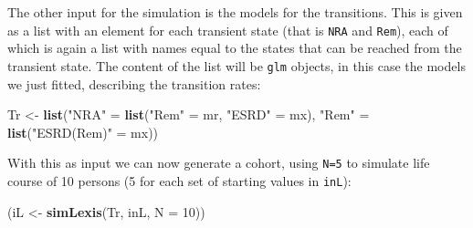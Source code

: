 \documentclass[
]{book}
\newenvironment{Shaded}{\begin{snugshade}}{\end{snugshade}}
\newcommand{\AttributeTok}[1]{\textcolor[rgb]{0.13,0.29,0.53}{#1}}
\newcommand{\DecValTok}[1]{\textcolor[rgb]{0.00,0.00,0.81}{#1}}
\newcommand{\FunctionTok}[1]{\textcolor[rgb]{0.13,0.29,0.53}{\textbf{#1}}}
\newcommand{\NormalTok}[1]{#1}
\newcommand{\OtherTok}[1]{\textcolor[rgb]{0.56,0.35,0.01}{#1}}
\newcommand{\StringTok}[1]{\textcolor[rgb]{0.31,0.60,0.02}{#1}}
\begin{document}
\begin{enumerate}
  The other input for the simulation is the models for the transitions. This is given as
  a list with an element for each transient state (that is \texttt{NRA} and
  \texttt{Rem}), each of which is again a list with names equal to the
  states that can be reached from the transient state. The content of
  the list will be \texttt{glm} objects, in this case the models we
  just fitted, describing the transition rates:

\begin{Shaded}
\begin{Highlighting}[]
\NormalTok{Tr }\OtherTok{\textless{}{-}} \FunctionTok{list}\NormalTok{(}\StringTok{"NRA"} \OtherTok{=} \FunctionTok{list}\NormalTok{(}\StringTok{"Rem"}  \OtherTok{=}\NormalTok{ mr,}
                        \StringTok{"ESRD"} \OtherTok{=}\NormalTok{ mx),}
           \StringTok{"Rem"} \OtherTok{=} \FunctionTok{list}\NormalTok{(}\StringTok{"ESRD(Rem)"} \OtherTok{=}\NormalTok{ mx))}
\end{Highlighting}
\end{Shaded}

  With this as input we can now generate a cohort, using \texttt{N=5}
  to simulate life course of 10 persons (5 for each set of starting values
  in \texttt{inL}):

\begin{Shaded}
\begin{Highlighting}[]
\NormalTok{(iL }\OtherTok{\textless{}{-}} \FunctionTok{simLexis}\NormalTok{(Tr, inL, }\AttributeTok{N =} \DecValTok{10}\NormalTok{))}
\end{Highlighting}
\end{Shaded}


\end{enumerate}
\end{document}
